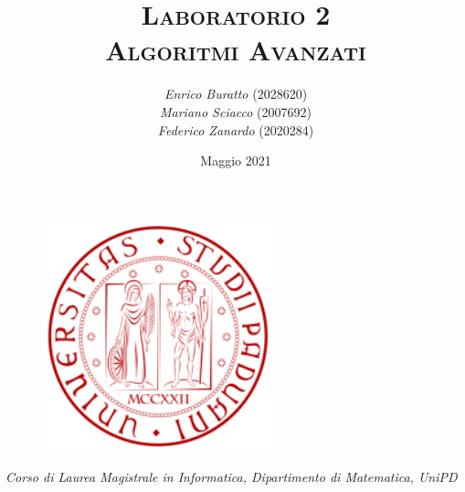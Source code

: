\documentclass[12pt]{article}
\title{ \huge\textsc{Laboratorio 2} \\
\large\textsc{Algoritmi Avanzati}}
\author{\textit{Enrico Buratto} (2028620)\\
\textit{Mariano Sciacco} (2007692)\\
\textit{Federico Zanardo} (2020284)}
\date{\small Maggio 2021}
\renewcommand{\baselinestretch}{1.075}
\newcommand{\hr}{\par\vspace{-.1\ht\strutbox}\noindent\hrulefill\par}
\begin{document}
 

\begin{figure}[t!]
    \centering
    \includegraphics[height=18em]{res/images/logo.png}
\end{figure}

\maketitle 
\thispagestyle{empty}

\begin{center}
    \vspace{12em}
    \hr
    \textit{Corso di Laurea Magistrale in Informatica, Dipartimento di Matematica, UniPD}
\end{center}

\newpage
\renewcommand{\baselinestretch}{0.95}\normalsize
\tableofcontents
\renewcommand{\baselinestretch}{1.075}\normalsize

\newpage

\end{document}
